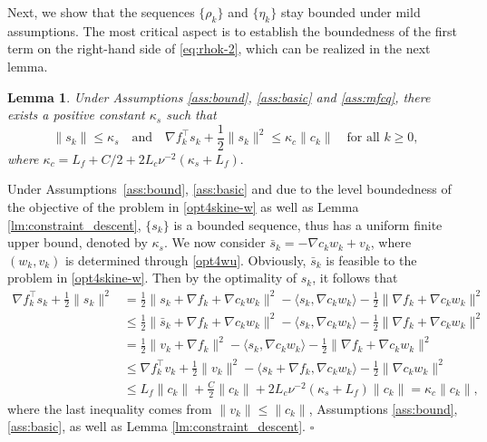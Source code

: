 \documentclass[11pt]{article}
\newenvironment{proof}{{\noindent\it Proof.}\quad}{\hfill $\square$\par}
\newcommand{\be}{\begin{equation}}
\newcommand{\ee}{\end{equation}}
\newtheorem{lemma}{Lemma}
\begin{document}
Next, we show that the sequences \(\{\rho_k\}\) and \(\{\eta_k\}\) stay bounded under mild assumptions. The most critical aspect is to establish the boundedness of the first term on the right-hand side of \eqref{eq:rhok-2}, which can be realized  in the next lemma.
\begin{lemma}\label{lm:bound_fsss}
    Under Assumptions \ref{ass:bound}, \ref{ass:basic} and \ref{ass:mfcq},   there exists a  positive constant \(\kappa_s\) such that  
    \[
     \|s_k\| \leq \kappa_s\quad\mbox{and}\quad    \nabla f_k^\top s_k + \frac{1}{2}\|s_k\|^2 \leq \kappa_c \|c_k\| \quad \mbox{for all } k\ge0,
    \]
    where $\kappa_c= L_f + {C}/{2} + 2L_c \nu^{-2}(\kappa_s+L_f).$
\end{lemma}
\begin{proof}
    Under Assumptions~\ref{ass:bound}, \ref{ass:basic} and due to the level boundedness of the objective of the problem in \eqref{opt4skine-w} as well as Lemma \ref{lm:constraint_descent},  \(\{ s_k\} \) is a bounded sequence, thus has a uniform finite upper bound, denoted by \(\kappa_s\). We now consider \(\bar{s}_k = - \nabla c_k w_k + v_k\), where \((w_k, v_k)\) is determined through \eqref{opt4wu}. Obviously, $\bar s_k$ is feasible to the problem in \eqref{opt4skine-w}. Then by the optimality of \( s_k \), it follows that
    \be\begin{aligned}\label{bound:g1}
        \nabla f_k^\top s_k + \frac{1}{2}\|s_k\|^2 &= \frac{1}{2}\|s_k+\nabla f_k + \nabla c_k w_k\|^2 - \langle s_k , \nabla c_k w_k \rangle - \frac{1}{2} \|\nabla f_k + \nabla c_k w_k\|^2\\
        &\leq \frac{1}{2}\|\bar s_k+\nabla f_k + \nabla c_k w_k\|^2 - \langle s_k , \nabla c_k w_k \rangle - \frac{1}{2} \|\nabla f_k + \nabla c_k w_k\|^2\\
        &= \frac{1}{2}\|v_k+\nabla f_k\|^2 - \langle s_k , \nabla c_k w_k \rangle - \frac{1}{2} \|\nabla f_k + \nabla c_k w_k\|^2\\
        &\leq \nabla f_k^\top v_k + \frac{1}{2}\|v_k\|^2 - \langle s_k + \nabla f_k , \nabla c_k w_k \rangle - \frac{1}{2}\|\nabla c_k w_k\|^2\\
        &\leq L_f \|c_k\| + \frac{C}{2} \|c_k\| + 2L_c\nu^{-2} (\kappa_s + L_f) \|c_k\| = \kappa_c \|c_k\|,
    \end{aligned}\ee
    where the last inequality comes from $\|v_k\|\le \|c_k\|$, Assumptions \ref{ass:bound}, \ref{ass:basic}, as well as Lemma \ref{lm:constraint_descent}. 
\end{proof}
\end{document}
